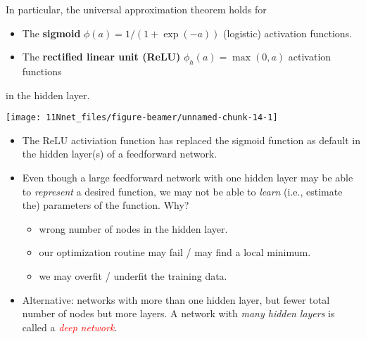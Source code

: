 \documentclass[10pt,ignorenonframetext,]{beamer}
\providecommand{\tightlist}{%
  \setlength{\itemsep}{0pt}\setlength{\parskip}{0pt}}
\begin{document}
\begin{frame}

In particular, the universal approximation theorem holds for

\begin{itemize}
\tightlist
\item
  The \textbf{sigmoid} \(\phi(a)=1/(1+\exp(-a))\) (logistic) activation
  functions.
\item
  The \textbf{rectified linear unit (ReLU)} \(\phi_h(a)=\max(0,a)\)
  activation functions
\end{itemize}

in the hidden layer.

\center

\texttt{[image: 11Nnet\_files/figure-beamer/unnamed-chunk-14-1]}

\end{frame}

\begin{frame}

\begin{itemize}
\tightlist
\item
  The ReLU activiation function has replaced the sigmoid function as
  default in the hidden layer(s) of a feedforward network.
\end{itemize}

\vspace{2mm}

\begin{itemize}
\tightlist
\item
  Even though a large feedforward network with one hidden layer may be
  able to \emph{represent} a desired function, we may not be able to
  \emph{learn} (i.e., estimate the) parameters of the function. Why?

  \begin{itemize}
  \tightlist
  \item
    wrong number of nodes in the hidden layer.
  \item
    our optimization routine may fail / may find a local minimum.
  \item
    we may overfit / underfit the training data.
  \end{itemize}
\end{itemize}

\vspace{2mm}

\begin{itemize}
\tightlist
\item
  Alternative: networks with more than one hidden layer, but fewer total
  number of nodes but more layers. A network with \emph{many hidden
  layers} is called a \emph{\textcolor{red}{deep network}}.
\end{itemize}

\end{frame}
\end{document}
